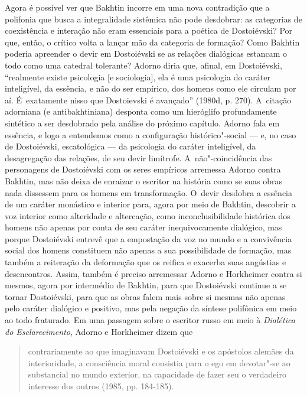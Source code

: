 Agora é possível ver que Bakhtin incorre em uma nova contradição que a
polifonia que busca a integralidade sistêmica não pode desdobrar: as
categorias de coexistência e interação não eram essenciais para a
poética de Dostoiévski? Por que, então, o crítico volta a lançar mão da
categoria de formação? Como Bakhtin poderia apreender o devir em
Dostoiévski se as relações dialógicas estancam o todo como uma catedral
tolerante? Adorno diria que, afinal, em Dostoiévski, ``realmente existe
psicologia {[}e sociologia{]}, ela é uma psicologia do caráter
inteligível, da essência, e não do ser empírico, dos homens como ele
circulam por aí. É~exatamente nisso que Dostoievski é avançado'' (1980d,
p. 270). A~citação adorniana (e antibakhtiniana) desponta como um
hieróglifo profundamente sintético a ser desdobrado pela análise do
próximo capítulo. Adorno fala em essência, e logo a entendemos como a
configuração histórico"-social --- e, no caso de Dostoiévski, escatológica
--- da psicologia do caráter inteligível, da desagregação das relações,
de seu devir limítrofe. A~não"-coincidência das personagens de
Dostoiévski com os seres empíricos arremessa Adorno contra Bakhtin, mas
não deixa de enraizar o escritor na história como se suas obras nada
dissessem para os homens em transformação. O~devir desdobra a essência
de um caráter monástico e interior para, agora por meio de Bakhtin,
descobrir a voz interior como alteridade e altercação, como
inconclusibilidade histórica dos homens não apenas por conta de seu
caráter inequivocamente dialógico, mas porque Dostoiévski entrevê que a
empostação da voz no mundo e a convivência social dos homens constituem
não apenas a sua possibilidade de formação, mas também a reiteração da
deformação que os reifica e exacerba suas angústias e desencontros.
Assim, também é preciso arremessar Adorno e Horkheimer contra si mesmos,
agora por intermédio de Bakhtin, para que Dostoiévski continue a se
tornar Dostoiévski, para que as obras falem mais sobre si mesmas não
apenas pelo caráter dialógico e positivo, mas pela negação da síntese
polifônica em meio ao todo fraturado. Em uma passagem sobre o escritor
russo em meio à \emph{Dialética do Esclarecimento}, Adorno e Horkheimer
dizem que

\begin{quote}
contrariamente ao que imaginavam Dostoiévski e os apóstolos alemães da
interioridade, a consciência moral consistia para o ego em devotar"-se ao
substancial no mundo exterior, na capacidade de fazer seu o verdadeiro
interesse dos outros (1985, pp. 184-185).
\end{quote}

